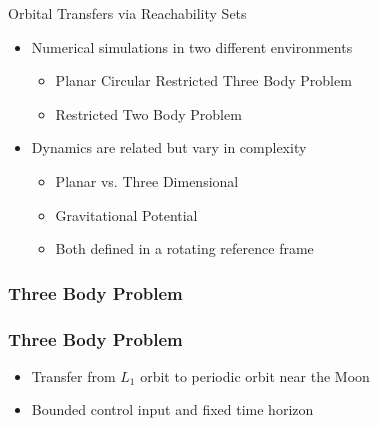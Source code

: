 \begin{frame}[t]{Orbital Transfers via Reachability Sets}
    \begin{itemize}
        \item Numerical simulations in two different environments
        \begin{itemize}
            \item Planar Circular Restricted Three Body Problem
            \item Restricted Two Body Problem 
        \end{itemize}
        \pause
        \item Dynamics are related but vary in complexity
        \begin{itemize}
            \item Planar vs. Three Dimensional
            \item Gravitational Potential
            \item Both defined in a rotating reference frame
        \end{itemize}
    \end{itemize}
\end{frame}

\subsubsection{Three Body Problem}

\begin{frame}%
\frametitle{Three Body Problem}
    \begin{itemize}
        \item Transfer from \( L_1 \) orbit to periodic orbit near the Moon
        \item Bounded control input and fixed time horizon
    \end{itemize}
    
\end{frame} %

